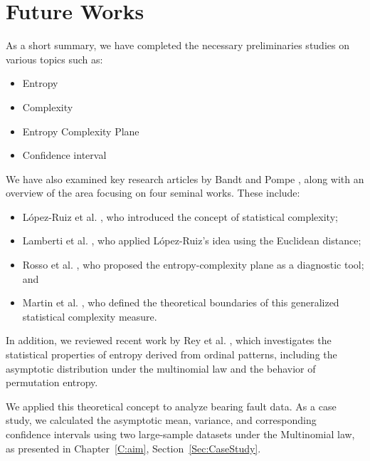 \chapter{Future Works}\label{C:futw}

As a short summary, we have completed the necessary preliminaries studies on various topics such as:
\begin{itemize}
    \item Entropy
    \item Complexity
    \item Entropy Complexity Plane
    \item Confidence interval
\end{itemize}

We have also examined key research articles by Bandt and Pompe \cite{PhysRevLett.88.174102}, along with an overview of the area focusing on four seminal works. These include:
\begin{itemize}
	\item López-Ruiz et al. \cite{lopez1995statistical}, who introduced the concept of statistical complexity;
	\item Lamberti et al. \cite{lamberti2004intensive}, who applied López-Ruiz's idea using the Euclidean distance;
	\item Rosso et al. \cite{EEGAnalysisUsingWaveletBasedInformationTools}, who proposed the entropy-complexity plane as a diagnostic tool; and
	\item Martin et al. \cite{Martin2006}, who defined the theoretical boundaries of this generalized statistical complexity measure.
\end{itemize}

In addition, we reviewed recent work by Rey et al. \cite{Rey2025,Rey2023a,Rey2023}, which investigates the statistical properties of entropy derived from ordinal patterns, including the asymptotic distribution under the multinomial law and the behavior of permutation entropy.

We applied this theoretical concept to analyze bearing fault data. As a case study, we calculated the asymptotic mean, variance, and corresponding confidence intervals using two large-sample datasets under the Multinomial law, as presented in Chapter~\ref{C:aim}, Section~\ref{Sec:CaseStudy}.

